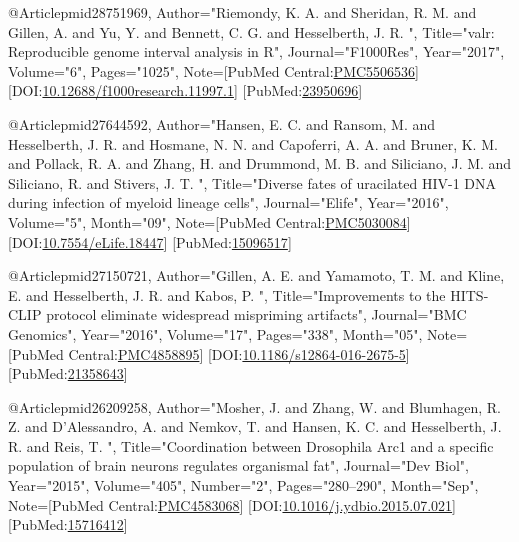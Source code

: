 @Article{pmid28751969,
   Author="Riemondy, K. A.  and Sheridan, R. M.  and Gillen, A.  and Yu, Y.  and Bennett, C. G.  and Hesselberth, J. R. ",
   Title="{valr: {R}eproducible genome interval analysis in {R}}",
   Journal="F1000Res",
   Year="2017",
   Volume="6",
   Pages="1025",
   Note={[PubMed Central:\href{https://www.ncbi.nlm.nih.gov/pmc/articles/PMC5506536}{PMC5506536}] [DOI:\href{https://dx.doi.org/10.12688/f1000research.11997.1}{10.12688/f1000research.11997.1}] [PubMed:\href{https://www.ncbi.nlm.nih.gov/pubmed/23950696}{23950696}] }
}

@Article{pmid27644592,
   Author="Hansen, E. C.  and Ransom, M.  and Hesselberth, J. R.  and Hosmane, N. N.  and Capoferri, A. A.  and Bruner, K. M.  and Pollack, R. A.  and Zhang, H.  and Drummond, M. B.  and Siliciano, J. M.  and Siliciano, R.  and Stivers, J. T. ",
   Title="{{D}iverse fates of uracilated {H}{I}{V}-1 {D}{N}{A} during infection of myeloid lineage cells}",
   Journal="Elife",
   Year="2016",
   Volume="5",
   Month="09",
   Note={[PubMed Central:\href{https://www.ncbi.nlm.nih.gov/pmc/articles/PMC5030084}{PMC5030084}] [DOI:\href{https://dx.doi.org/10.7554/eLife.18447}{10.7554/eLife.18447}] [PubMed:\href{https://www.ncbi.nlm.nih.gov/pubmed/15096517}{15096517}] }
}

@Article{pmid27150721,
   Author="Gillen, A. E.  and Yamamoto, T. M.  and Kline, E.  and Hesselberth, J. R.  and Kabos, P. ",
   Title="{{I}mprovements to the {H}{I}{T}{S}-{C}{L}{I}{P} protocol eliminate widespread mispriming artifacts}",
   Journal="BMC Genomics",
   Year="2016",
   Volume="17",
   Pages="338",
   Month="05",
   Note={[PubMed Central:\href{https://www.ncbi.nlm.nih.gov/pmc/articles/PMC4858895}{PMC4858895}] [DOI:\href{https://dx.doi.org/10.1186/s12864-016-2675-5}{10.1186/s12864-016-2675-5}] [PubMed:\href{https://www.ncbi.nlm.nih.gov/pubmed/21358643}{21358643}] }
}

@Article{pmid26209258,
   Author="Mosher, J.  and Zhang, W.  and Blumhagen, R. Z.  and D'Alessandro, A.  and Nemkov, T.  and Hansen, K. C.  and Hesselberth, J. R.  and Reis, T. ",
   Title="{{C}oordination between {D}rosophila {A}rc1 and a specific population of brain neurons regulates organismal fat}",
   Journal="Dev Biol",
   Year="2015",
   Volume="405",
   Number="2",
   Pages="280--290",
   Month="Sep",
   Note={[PubMed Central:\href{https://www.ncbi.nlm.nih.gov/pmc/articles/PMC4583068}{PMC4583068}] [DOI:\href{https://dx.doi.org/10.1016/j.ydbio.2015.07.021}{10.1016/j.ydbio.2015.07.021}] [PubMed:\href{https://www.ncbi.nlm.nih.gov/pubmed/15716412}{15716412}] }
}

